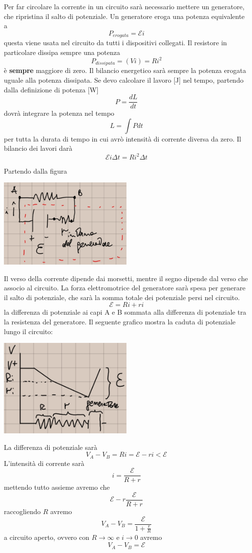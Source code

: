 \documentclass[a4paper, 12pt]{book}
\theoremstyle{plain}
\begin{document}
Per far circolare la corrente in un circuito sarà necessario 
mettere un generatore, che ripristina il salto 
di potenziale. Un generatore eroga una potenza equivalente 
a \[ P_{erogata} = \mathcal{E} i \] questa viene usata nel circuito da 
tutti i dispositivi collegati. Il resistore in particolare 
dissipa sempre una potenza \[ P_{dissipata} = (Vi) = Ri^2 \] è \textbf{sempre} 
maggiore di zero. Il bilancio energetico sarà sempre 
la potenza erogata uguale alla potenza dissipata. Se devo 
calcolare il lavoro [J] nel tempo, partendo dalla definizione 
di potenza [W] \[ P = \frac{dL}{dt} \] dovrà integrare 
la potenza nel tempo \[ L = \int Pdt \] per tutta 
la durata di tempo in cui avrò intensità di corrente 
diversa da zero. Il bilancio dei lavori darà \[ \mathcal{E}i \Delta t = Ri^2 \Delta t \] 

Partendo dalla figura
\begin{center}
    \includegraphics[width=0.5\textwidth]{circ_res.jpg}
\end{center}
Il verso della corrente dipende dai morsetti, mentre il 
segno dipende dal verso che associo al circuito. La forza 
elettromotrice del generatore sarà spesa per generare 
il salto di potenziale, che sarà la somma totale dei potenziale 
persi nel circuito. \[ \mathcal{E} = Ri + ri \] la differenza 
di potenziale ai capi A e B sommata alla differenza di 
potenziale tra la resistenza del generatore. Il seguente 
grafico mostra la caduta di potenziale lungo il circuito:
\begin{center}
    \includegraphics[width=0.5\textwidth]{graf_potenziale.jpg}
\end{center}
La differenza di potenziale sarà \[ V_A - V_B = Ri = \mathcal{E} - ri < \mathcal{E} \]
L'intensità di corrente sarà \[ i = \frac{\mathcal{E}}{R + r} \] 
mettendo tutto assieme avremo che \[ \mathcal{E} - r \frac{\mathcal{E}}{R + r}\] 
raccogliendo $R$ avremo \[ V_A - V_B = \frac{\mathcal{E}}{1 + \frac{r}{R}} \]
a circuito aperto, ovvero con $R\rightarrow \infty$ e $i\rightarrow 0$ avremo 
\[V_A - V_B = \mathcal{E}\]
\end{document}

